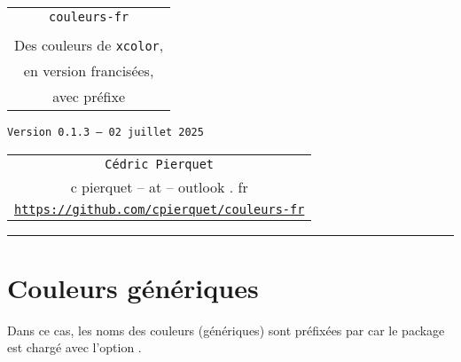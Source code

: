 \documentclass[french,11pt,a4paper]{article}
\def\TPversion{0.1.3}
\def\TPdate{02 juillet 2025}
\begin{document}
\pagestyle{fancy}

\thispagestyle{empty}

\begin{center}
	\begin{minipage}{0.75\linewidth}
	\begin{tcolorbox}[colframe=yellow,colback=yellow!15]
		\begin{center}
			\begin{tabular}{c}
				{\Huge \texttt{couleurs-fr}}\\
				\\
				{\LARGE Des couleurs de \texttt{xcolor},} \\
				{\LARGE en version francisées,} \\
				{\LARGE avec préfixe}
			\end{tabular}
			
			\medskip
			
			{\small \texttt{Version \TPversion{} -- \TPdate}}
		\end{center}
	\end{tcolorbox}
\end{minipage}
\end{center}

\vspace*{1mm}

\begin{center}
	\begin{tabular}{c}
	\texttt{Cédric Pierquet}\\
	{\ttfamily c pierquet -- at -- outlook . fr}\\
	\texttt{\url{https://github.com/cpierquet/couleurs-fr}}
\end{tabular}
\end{center}

\hrule

\vspace*{5mm}


\section{Couleurs génériques}

Dans ce cas, les noms des couleurs (génériques) sont préfixées par  car le package est chargé avec l'option \MontreCode{[Prefixe]}.
\end{document}
